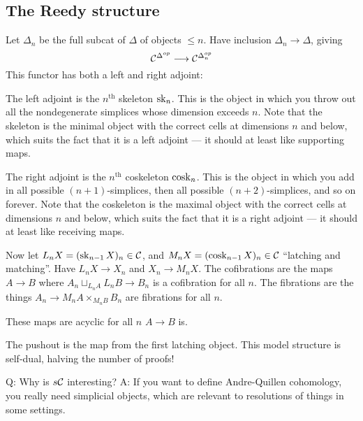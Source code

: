 \begin{InnaSimplicalModelCats}
\subsection*{The Reedy structure}
\begin{defn*} Let $\Delta_n$ be the full subcat of $\Delta$ of objects $\leq n$. Have inclusion $\Delta_n\to\Delta$, giving
\[\mathcal{C}^{\Delta^{op}}\longrightarrow\mathcal{C}^{\Delta^{op}_n}\]
This functor has both a left and right adjoint:
\begin{itemise}
\item The left adjoint is the $n^\text{th}$ skeleton $\operatorname{sk}_n$. This is the object in which you throw out all the nondegenerate simplices whose dimension exceeds $n$. Note that the skeleton is the minimal object with the correct cells at dimensions $n$ and below, which suits the fact that it is a left adjoint --- it should at least like supporting maps.
\item The right adjoint is the $n^\text{th}$ coskeleton $\operatorname{cosk}_n$. This is the object in which you add in all possible $(n+1)$-simplices, then all possible $(n+2)$-simplices, and so on forever. Note that the coskeleton is the maximal object with the correct cells at dimensions $n$ and below, which suits the fact that it is a right adjoint --- it should at least like receiving maps.
\end{itemise}
Now let $L_nX=(\operatorname{sk}_{n-1}X)_n\in\mathcal{C}$, and $M_nX=(\operatorname{cosk}_{n-1}X)_n\in\mathcal{C}$ ``latching and matching''. Have $L_nX\to X_n$ and $X_n\to M_nX$. The cofibrations are the maps $A\to B$ where $A_n\sqcup_{L_nA}L_nB\to B_n$ is a cofibration for all $n$.
The fibrations are the things $A_n\to M_nA\times_{M_nB}B_n$ are fibrations for all $n$.
\end{defn*}
\begin{cor*}
These maps are acyclic for all $n$ \Iff $A\to B$ is.
\end{cor*}
The pushout is the map from the first latching object. This model structure is self-dual, halving the number of proofs!

Q: Why is $s\mathcal{C}$ interesting?
A: If you want to define Andre-Quillen cohomology, you really need simplicial objects, which are relevant to resolutions of things in some settings.

\pagebreak
\end{InnaSimplicalModelCats}
